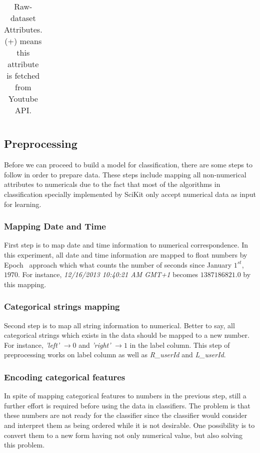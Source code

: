 \begin{table}[p]
\begin{center}
\begin{tabular}{||l|l||}
	\end{tabular}
\end{center}
	\caption{Raw-dataset Attributes. (+) means this attribute is fetched from
	Youtube API.
	\label{ds3:table:attributes}}
\end{table}






\subsection{Preprocessing}

Before we can proceed to build a model for classification, there are some steps
to follow in order to prepare data. These steps include mapping all
non-numerical attributes to numericals due to the fact that most of the
algorithms in classification specially implemented by SciKit only accept
numerical data as input for learning.

\subsubsection{Mapping Date and Time}

First step is to map date and time information to numerical correspondence. In
this experiment, all date and time information are mapped to float numbers by
Epoch~\cite{} approach which what counts the number of seconds since January 
$1^{st}$, $1970$. For instance, {\it 12/16/2013 10:40:21 AM GMT+1} becomes
$1387186821.0$ by this mapping.

\subsubsection{Categorical strings mapping}

Second step is to map all string information to numerical. Better to say, all
categorical strings which exists in the data should be mapped to a new number.
For instance, {\it 'left'} $\to 0$ and {\it 'right'} $\to 1$ in the label
column. This step of preprocessing works on label column as well as
{\it R\_userId} and {\it L\_userId}.

\subsubsection{Encoding categorical features} 

In spite of mapping categorical features to numbers in the previous step, still
a further effort is required before using the data in classifiers. The problem
is that these numbers are not ready for the classifier since the classifier
would consider and interpret them as being ordered while it is not desirable.
One possibility is to convert them to a new form having not only numerical
value, but also solving this problem. 

